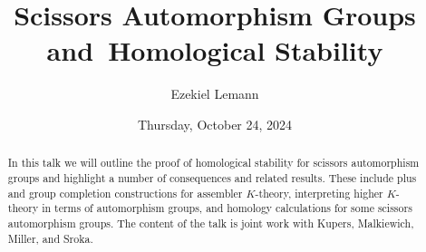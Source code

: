\documentclass{UAmathtalk}
\author{Ezekiel Lemann}
\title{Scissors Automorphism Groups and~Homological Stability}
\date{Thursday, October 24, 2024}
\begin{document}
\maketitle

\begin{abstract}
In this talk we will outline the proof of homological stability for scissors automorphism groups and highlight a number of consequences and related results. These include plus and group completion constructions for assembler $K$-theory, interpreting higher $K$-theory in terms of automorphism groups, and homology calculations for some scissors automorphism groups. The content of the talk is joint work with Kupers, Malkiewich, Miller, and Sroka.
\end{abstract}
\end{document}
